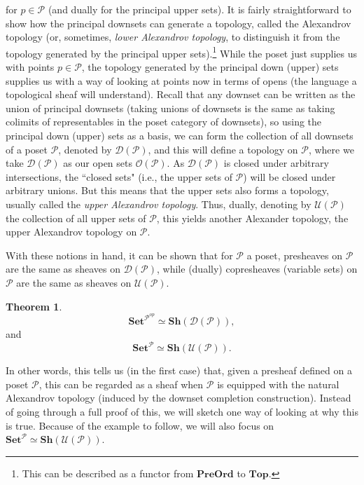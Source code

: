 \documentclass[a4paper]{book}
\theoremstyle{definition}
\theoremstyle{definition}
\theoremstyle{definition}
\newtheorem{theorem}{Theorem}[section]
\theoremstyle{theorem}
\theoremstyle{definition}
\begin{document}
for $p \in \mathcal{P}$ (and dually for the principal upper sets). It is fairly straightforward to show how the principal downsets can generate a topology, called the Alexandrov topology (or, sometimes, \textit{lower Alexandrov topology}, to distinguish it from the topology generated by the principal upper sets).\footnote{This can be described as a functor from $\textbf{PreOrd}$ to $\textbf{Top}$.} While the poset just supplies us with points $p \in \mathcal{P}$, the topology generated by the principal down (upper) sets supplies us with a way of looking at points now in terms of opens (the language a topological sheaf will understand).  Recall that any downset can be written as the union of principal downsets (taking unions of downsets is the same as taking colimits of representables in the poset category of downsets), so using the principal down (upper) sets as a basis, we can form the collection of all downsets of a poset $\mathcal{P}$, denoted by $\mathcal{D}(\mathcal{P})$, and this will define a topology on $\mathcal{P}$, where we take $\mathcal{D}(\mathcal{P})$ as our open sets $\mathscr{O}(\mathcal{P})$. As $\mathcal{D}(\mathcal{P})$ is closed under arbitrary intersections, the ``closed sets" (i.e., the upper sets of $\mathcal{P}$) will be closed under arbitrary unions. But this means that the upper sets also forms a topology, usually called the \textit{upper Alexandrov topology}. Thus, dually, denoting by $\mathcal{U}(\mathcal{P})$ the collection of all upper sets of $\mathcal{P}$, this yields another Alexander topology, the upper Alexandrov topology on $\mathcal{P}$. \par     
With these notions in hand, it can be shown that for $\mathcal{P}$ a poset, presheaves on $\mathcal{P}$ are the same as sheaves on $\mathcal{D}(\mathcal{P})$, while (dually) copresheaves (variable sets) on $\mathcal{P}$ are the same as sheaves on $\mathcal{U}(\mathcal{P})$. 
\begin{theorem}
	\begin{equation*}
	\textbf{Set}^{\mathcal{P}^{op}} \simeq \textbf{Sh}(\mathcal{D}(\mathcal{P})),
	\end{equation*}
	and 
	\begin{equation*}
	\textbf{Set}^{\mathcal{P}} \simeq \textbf{Sh}(\mathcal{U}(\mathcal{P})).
	\end{equation*}
\end{theorem} \noindent 
In other words, this tells us (in the first case) that, given a presheaf defined on a poset $\mathcal{P}$, this can be regarded as a sheaf when $\mathcal{P}$ is equipped with the natural Alexandrov topology (induced by the downset completion construction). Instead of going through a full proof of this, we will sketch one way of looking at why this is true. Because of the example to follow, we will also focus on $\textbf{Set}^{\mathcal{P}} \simeq \textbf{Sh}(\mathcal{U}(\mathcal{P}))$.\par 
\end{document}
